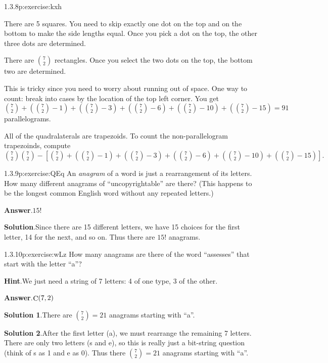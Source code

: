 \documentclass[twoside,11pt,]{book}
\newcommand{\blocktitlefont}{\relax}
\numberwithin{equation}{chapter}
\begin{document}
\begin{divisionsolution}{1.3.8}{}{p:exercise:kxh}
\par
There are 5 squares. You need to skip exactly one dot on the top and on the bottom to make the side lengths equal. Once you pick a dot on the top, the other three dots are determined.%
\par
There are \({7 \choose 2}\) rectangles. Once you select the two dots on the top, the bottom two are determined.%
\par
This is tricky since you need to worry about running out of space. One way to count: break into cases by the location of the top left corner. You get \({7 \choose 2} + ({7 \choose 2}-1) + ({7 \choose 2} - 3) + ({7 \choose 2} - 6) + ({7 \choose 2} - 10) + ({7 \choose 2} - 15) = 91\) parallelograms.%
\par
All of the quadralaterals are trapezoids. To count the non-parallelogram trapezoinds, compute \({7\choose 2}{7\choose 2} - \left[ {7 \choose 2} + ({7 \choose 2}-1) + ({7 \choose 2} - 3) + ({7 \choose 2} - 6) + ({7 \choose 2} - 10) + ({7 \choose 2} - 15) \right]\text{.}\)%
\end{divisionsolution}%
\begin{divisionsolution}{1.3.9}{}{p:exercise:QEq}%
An \emph{anagram} of a word is just a rearrangement of its letters. How many different anagrams of ``uncopyrightable'' are there? (This happens to be the longest common English word without any repeated letters.)%
\par\smallskip%
\noindent\textbf{\blocktitlefont Answer}.\quad{}\(15!\)%
\par\smallskip%
\noindent\textbf{\blocktitlefont Solution}.\quad{}Since there are 15 different letters, we have 15 choices for the first letter, 14 for the next, and so on. Thus there are \(15!\) anagrams.%
\end{divisionsolution}%
\begin{divisionsolution}{1.3.10}{}{p:exercise:wLz}%
How many anagrams are there of the word ``assesses'' that start with the letter ``a''?%
\par\smallskip%
\noindent\textbf{\blocktitlefont Hint}.\quad{}We just need a string of 7 letters: 4 of one type, 3 of the other.%
\par\smallskip%
\noindent\textbf{\blocktitlefont Answer}.\quad{}\(\mathop{\rm C}\nolimits\!\left(7,2\right)\)%
\par\smallskip%
\noindent\textbf{\blocktitlefont Solution 1}.\quad{}There are \({7 \choose 2} = 21\) anagrams starting with ``a''.%
\par\smallskip%
\noindent\textbf{\blocktitlefont Solution 2}.\quad{}After the first letter (a), we must rearrange the remaining 7 letters. There are only two letters (s and e), so this is really just a bit-string question (think of s as 1 and e as 0). Thus there \({7 \choose 2} = 21\) anagrams starting with ``a''.%
\end{divisionsolution}%
\end{document}
